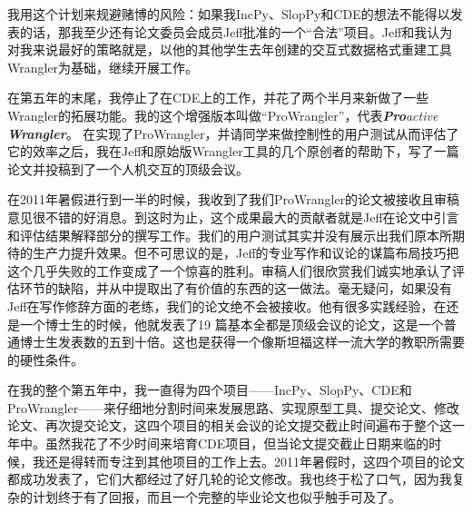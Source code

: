 \documentclass[letter,12pt]{book}
\begin{document}
\begin{CJK}{UTF8}{gbsn}
我用这个计划来规避赌博的风险：如果我IncPy、SlopPy和CDE的想法不能得以发表的话，那我至少还有论文委员会成员Jeff批准的一个“合法”项目。Jeff和我认为对我来说最好的策略就是，以他的其他学生去年创建的交互式数据格式重建工具Wrangler为基础，继续开展工作。

在第五年的末尾，我停止了在CDE上的工作，并花了两个半月来新做了一些Wrangler的拓展功能。我的这个增强版本叫做“ProWrangler”，代表\emph{\textbf{Pro}active \textbf{Wrangler}}。 在实现了ProWrangler，并请同学来做控制性的用户测试从而评估了它的效率之后，我在Jeff和原始版Wrangler工具的几个原创者的帮助下，写了一篇论文并投稿到了一个人机交互的顶级会议。

在2011年暑假进行到一半的时候，我收到了我们ProWrangler的论文被接收且审稿意见很不错的好消息。到这时为止，这个成果最大的贡献者就是Jeff在论文中引言和评估结果解释部分的撰写工作。我们的用户测试其实并没有展示出我们原本所期待的生产力提升效果。但不可思议的是，Jeff的专业写作和议论的谋篇布局技巧把这个几乎失败的工作变成了一个惊喜的胜利。审稿人们很欣赏我们诚实地承认了评估环节的缺陷，并从中提取出了有价值的东西的这一做法。毫无疑问，如果没有Jeff在写作修辞方面的老练，我们的论文绝不会被接收。他有很多实践经验，在还是一个博士生的时候，他就发表了19 篇基本全都是顶级会议的论文，这是一个普通博士生发表数的五到十倍。这也是获得一个像斯坦福这样一流大学的教职所需要的硬性条件。

\breakline

在我的整个第五年中，我一直得为四个项目——IncPy、SlopPy、CDE和ProWrangler——来仔细地分割时间来发展思路、实现原型工具、提交论文、修改论文、再次提交论文，这四个项目的相关会议的论文提交截止时间遍布于整个这一年中。虽然我花了不少时间来培育CDE项目，但当论文提交截止日期来临的时候，我还是得转而专注到其他项目的工作上去。2011年暑假时，这四个项目的论文都成功发表了，它们大都经过了好几轮的论文修改。我也终于松了口气，因为我复杂的计划终于有了回报，而且一个完整的毕业论文也似乎触手可及了。



\clearpage
\clearpage

\end{CJK}
\end{document}
